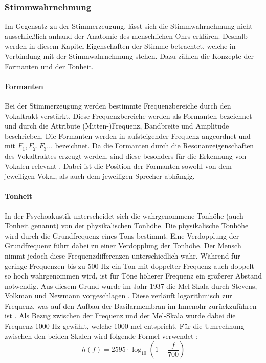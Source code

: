 \subsubsection{Stimmwahrnehmung}
Im Gegensatz zu der Stimmerzeugung, lässt sich die Stimmwahrnehmung nicht ausschließlich anhand der Anatomie des menschlichen Ohrs erklären.
Deshalb werden in diesem Kapitel Eigenschaften der Stimme betrachtet, welche in Verbindung mit der Stimmwahrnehmung stehen.
Dazu zählen die Konzepte der Formanten und der Tonheit.

\paragraph{Formanten}
Bei der Stimmerzeugung werden bestimmte Frequenzbereiche durch den Vokaltrakt verstärkt.
Diese Frequenzbereiche werden als Formanten bezeichnet und durch die Attribute (Mitten-)Frequenz, Bandbreite und Amplitude beschrieben.
Die Formanten werden in aufsteigender Frequenz angeordnet und mit $F_1, F_2, F_3 \dots$ bezeichnet.
Da die Formanten durch die Resonanzeigenschaften des Vokaltraktes erzeugt werden, sind diese besonders für die Erkennung von Vokalen relevant \autocite[vgl.][S. 19-20]{pfister_sprachverarbeitung_2017}.
Dabei ist die Position der Formanten sowohl von dem jeweiligen Vokal, als auch dem jeweiligen Sprecher abhängig.
% 

\paragraph{Tonheit}
In der Psychoakustik unterscheidet sich die wahrgenommene Tonhöhe (auch Tonheit genannt) von der physikalischen Tonhöhe.
Die physikalische Tonhöhe wird durch die Grundfrequenz eines Tons bestimmt.
Eine Verdopplung der Grundfrequenz führt dabei zu einer Verdopplung der Tonhöhe.
Der Mensch nimmt jedoch diese Frequenzdifferenzen unterschiedlich wahr.
Während für geringe Frequenzen bis zu 500 Hz ein Ton mit doppelter Frequenz auch doppelt so hoch wahrgenommen wird, ist für Töne höherer Frequenz ein größerer Abstand notwendig.
Aus diesem Grund wurde im Jahr 1937 die Mel-Skala durch Stevens, Volkman und Newmann vorgeschlagen \autocite[vgl.][S. 11]{moser_psychoakustische_2018}.
Diese verläuft logarithmisch zur Frequenz, was auf den Aufbau der Basilarmembran im Innenohr zurückzuführen ist \autocite[vgl.][S. 54]{kroger_neuronale_2018}.
Als Bezug zwischen der Frequenz und der Mel-Skala wurde dabei die Frequenz 1000 Hz gewählt, welche 1000 mel entspricht.
Für die Umrechnung zwischen den beiden Skalen wird folgende Formel verwendet \autocite[vgl.][S. 94-95]{pfister_sprachverarbeitung_2017}:
\begin{equation}
    \label{eq:mel}
    h(f) = 2595 \cdot \log_{10}\left(1 + \frac{f}{700}\right)
\end{equation}

